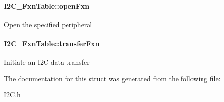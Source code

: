 \paragraph[{open\+Fxn}]{ I2\+C\+\_\+\+Fxn\+Table\+::open\+Fxn}\label{struct_i2_c___fxn_table_afb8c5f67ba6d0941f6265707083b16f8}
Open the specified peripheral 
\paragraph[{transfer\+Fxn}]{ I2\+C\+\_\+\+Fxn\+Table\+::transfer\+Fxn}\label{struct_i2_c___fxn_table_a16048b22814e3d123f82a7674599b15c}
Initiate an I2\+C data transfer 

The documentation for this struct was generated from the following file\+:\begin{DoxyCompactItemize}
\item 
\hyperlink{_i2_c_8h}{I2\+C.\+h}\end{DoxyCompactItemize}
